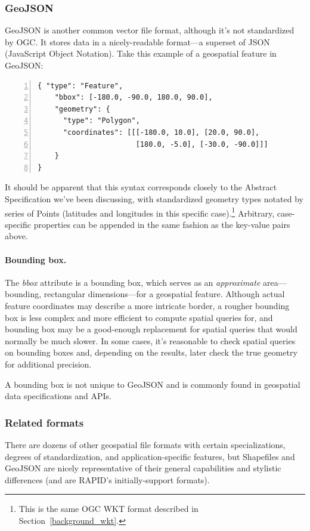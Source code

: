 \subsubsection{GeoJSON}
GeoJSON is another common vector file format, although it's not standardized by OGC. It stores data in a nicely-readable format---a superset of JSON (JavaScript Object Notation). Take this example of a geospatial feature in GeoJSON:

\begin{Verbatim}[samepage=true,baselinestretch=1,numbers=left,xleftmargin=12mm]
{ "type": "Feature",
    "bbox": [-180.0, -90.0, 180.0, 90.0],
    "geometry": {
      "type": "Polygon",
      "coordinates": [[[-180.0, 10.0], [20.0, 90.0],
                       [180.0, -5.0], [-30.0, -90.0]]]
    }
}
\end{Verbatim}

It should be apparent that this syntax corresponds closely to the Abstract Specification we've been discussing, with standardized geometry types notated by series of Points (latitudes and longitudes in this specific case).\footnote{This is the same OGC WKT format described in Section~\ref{background_wkt}.} Arbitrary, case-specific properties can be appended in the same fashion as the key-value pairs above.

\paragraph{Bounding box.}
The \textit{bbox} attribute is a bounding box, which serves as an \textit{approximate} area---bounding, rectangular dimensions---for a geospatial feature. Although actual feature coordinates may describe a more intricate border, a rougher bounding box is less complex and more efficient to compute spatial queries for, and bounding box may be a good-enough replacement for spatial queries that would normally be much slower. In some cases, it's reasonable to check spatial queries on bounding boxes and, depending on the results, later check the true geometry for additional precision.

A bounding box is not unique to GeoJSON and is commonly found in geospatial data specifications and APIs.

\subsubsection{Related formats}
There are dozens of other geospatial file formats with certain specializations, degrees of standardization, and application-specific features, but Shapefiles and GeoJSON are nicely representative of their general capabilities and stylistic differences (and are RAPID's initially-support formats).
